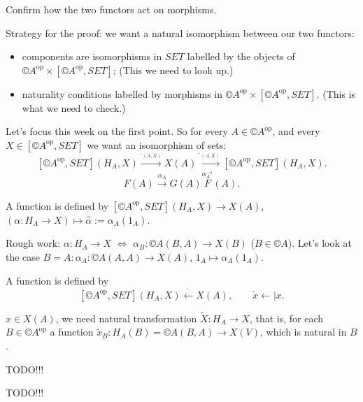 \documentclass[12pt]{article}					%
\newcommand{\op}{^{\text{op}}}
\begin{document}
\begin{priklad}
	Confirm how the two functors act on morphisms.
\end{priklad}

\begin{dukaz}[Yoneda]
	Strategy for the proof: we want a natural isomorphism between our two functors:
	\begin{itemize}
		\item components are isomorphisms in $SET$ labelled by the objects of $©A\op \times [©A\op, SET]$; (This we need to look up.)
		\item naturality conditions labelled by morphisms in $©A\op \times [©A\op, SET]$. (This is what we need to check.)
	\end{itemize}

	Let's focus this week on the first point. So for every $A \in ©A\op$, and every $X \in [©A\op, SET]$ we want an isomorphism of sets:
	$$ [©A\op, SET](H_A, X) \overset{\hat{\ }_{(A, X)}}\rightarrow X(A) \overset{\tilde{\ }_{(A, X)}}\rightarrow [©A\op, SET](H_A, X). $$
	$$ F(A) \overset{α_A}\rightarrow G(A) \overset{α_A^{-1}} F(A). $$

	\begin{lemmain}[Observation]
		A function is defined by $[©A\op, SET](H_A, X) \overset{\hat{\ }}\rightarrow X(A)$, $(α: H_A \rightarrow X) \mapsto \hat{α} := α_A(1_A)$.

		Rough work: $α: H_A \rightarrow X$ $\Leftrightarrow$ $α_B: ©A(B, A) \rightarrow X(B)$ ($B \in ©A$). Let's look at the case $B = A: α_A: ©A(A, A) \rightarrow X(A)$, $1_A \mapsto α_A(1_A)$.
	\end{lemmain}

	\begin{lemmain}
		A function is defined by
		$$ [©A\op, SET](H_A, X) \overset{\tilde{\ }}\leftarrow X(A), \qquad \tilde x \leftarrow| x. $$
	\end{lemmain}

	\begin{dukazin}
		$x \in X(A)$, we need natural transformation $\tilde X: H_A \rightarrow X$, that is, for each $B \in ©A\op$ a function $\tilde x_B: H_A(B) = ©A(B, A) \rightarrow X(V)$, which is natural in $B$.

		TODO!!!
	\end{dukazin}

	TODO!!!
\end{dukaz}
\end{document}
